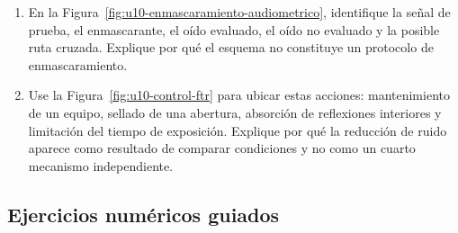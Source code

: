 \begin{enumerate}[label=\textbf{V\arabic*.},leftmargin=*]
    \item En la Figura~\ref{fig:u10-enmascaramiento-audiometrico}, identifique
    la señal de prueba, el enmascarante, el oído evaluado, el oído no evaluado
    y la posible ruta cruzada. Explique por qué el esquema no constituye un
    protocolo de enmascaramiento.

    \item Use la Figura~\ref{fig:u10-control-ftr} para ubicar estas acciones:
    mantenimiento de un equipo, sellado de una abertura, absorción de
    reflexiones interiores y limitación del tiempo de exposición. Explique por
    qué la reducción de ruido aparece como resultado de comparar condiciones
    y no como un cuarto mecanismo independiente.
\end{enumerate}

\subsection*{Ejercicios numéricos guiados}

